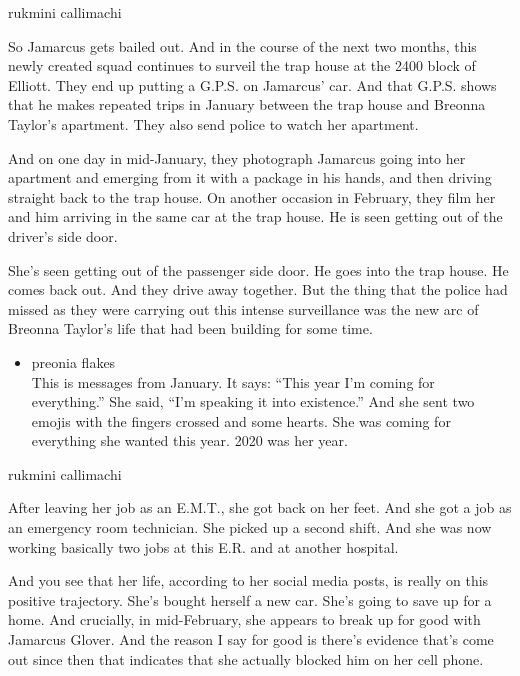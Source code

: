 rukmini callimachi

So Jamarcus gets bailed out. And in the course of the next two months,
this newly created squad continues to surveil the trap house at the 2400
block of Elliott. They end up putting a G.P.S. on Jamarcus' car. And
that G.P.S. shows that he makes repeated trips in January between the
trap house and Breonna Taylor's apartment. They also send police to
watch her apartment.

And on one day in mid-January, they photograph Jamarcus going into her
apartment and emerging from it with a package in his hands, and then
driving straight back to the trap house. On another occasion in
February, they film her and him arriving in the same car at the trap
house. He is seen getting out of the driver's side door.

She's seen getting out of the passenger side door. He goes into the trap
house. He comes back out. And they drive away together. But the thing
that the police had missed as they were carrying out this intense
surveillance was the new arc of Breonna Taylor's life that had been
building for some time.

\begin{itemize}
\tightlist
\item
  preonia flakes\\
  This is messages from January. It says: ``This year I'm coming for
  everything.'' She said, ``I'm speaking it into existence.'' And she
  sent two emojis with the fingers crossed and some hearts. She was
  coming for everything she wanted this year. 2020 was her year.
\end{itemize}

rukmini callimachi

After leaving her job as an E.M.T., she got back on her feet. And she
got a job as an emergency room technician. She picked up a second shift.
And she was now working basically two jobs at this E.R. and at another
hospital.

And you see that her life, according to her social media posts, is
really on this positive trajectory. She's bought herself a new car.
She's going to save up for a home. And crucially, in mid-February, she
appears to break up for good with Jamarcus Glover. And the reason I say
for good is there's evidence that's come out since then that indicates
that she actually blocked him on her cell phone.

